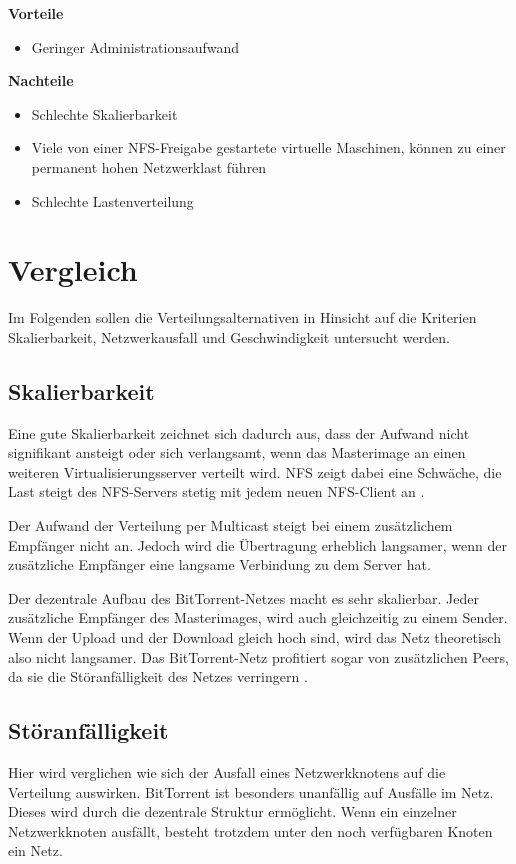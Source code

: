 
\textbf{Vorteile}
\begin{itemize}
 \item Geringer Administrationsaufwand
\end{itemize}

\textbf{Nachteile}
\begin{itemize}
 \item Schlechte Skalierbarkeit
 \item Viele von einer NFS-Freigabe gestartete virtuelle Maschinen, können zu einer permanent hohen Netzwerklast führen
 \item Schlechte Lastenverteilung
\end{itemize}

\section{Vergleich}
Im Folgenden sollen die Verteilungsalternativen in Hinsicht auf die Kriterien Skalierbarkeit, Netzwerkausfall und Geschwindigkeit untersucht werden.

\subsection{Skalierbarkeit}
Eine gute Skalierbarkeit zeichnet sich dadurch aus, dass der Aufwand nicht signifikant ansteigt oder sich verlangsamt, wenn das Masterimage an einen weiteren Virtualisierungsserver verteilt wird. NFS zeigt dabei eine Schwäche, die Last steigt des NFS-Servers stetig mit jedem neuen NFS-Client an \cite{nfsharmful}. 

Der Aufwand der Verteilung per Multicast steigt bei einem zusätzlichem Empfänger nicht an. Jedoch wird die Übertragung erheblich langsamer, wenn der zusätzliche Empfänger eine langsame Verbindung zu dem Server hat. 

Der dezentrale Aufbau des BitTorrent-Netzes macht es sehr skalierbar. Jeder zusätzliche Empfänger des Masterimages, wird auch gleichzeitig zu einem Sender. Wenn der Upload und der Download gleich hoch sind, wird das Netz theoretisch also nicht langsamer. Das BitTorrent-Netz profitiert sogar von zusätzlichen Peers, da sie die Störanfälligkeit des Netzes verringern \cite{btscalability}.

\subsection{Störanfälligkeit}
Hier wird verglichen wie sich der Ausfall eines Netzwerkknotens auf die Verteilung auswirken. BitTorrent ist besonders unanfällig auf Ausfälle im Netz. Dieses wird durch die dezentrale Struktur ermöglicht. Wenn ein einzelner Netzwerkknoten ausfällt, besteht trotzdem unter den noch verfügbaren Knoten ein Netz. 

